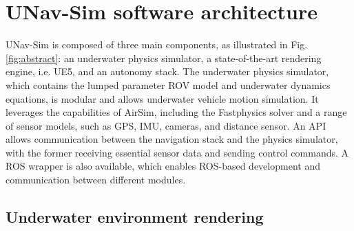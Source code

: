 \section{UNav-Sim software architecture} \label{sec:description}


UNav-Sim is composed of three main components, as illustrated in Fig. \ref{fig:abstract}: an underwater physics simulator, a state-of-the-art rendering engine, i.e. \ac{UE5}, and an autonomy stack. The underwater physics simulator, which contains the lumped parameter \ac{ROV} model and underwater dynamics equations, is modular and allows underwater vehicle motion simulation. %
It leverages the capabilities of AirSim, including the Fastphysics solver and a range of sensor models, such as GPS, IMU, cameras, and distance sensor. %
An API allows communication between the navigation stack and the physics simulator, with the former receiving essential sensor data and sending control commands. A \ac{ROS} wrapper is also available, which enables \ac{ROS}-based development and communication between different modules.






\subsection{Underwater environment rendering}





